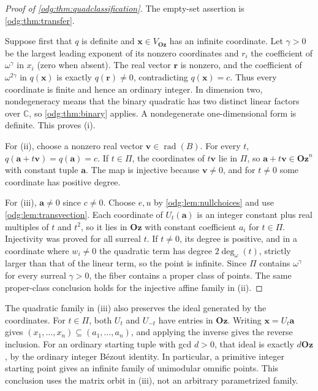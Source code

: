\documentclass[11pt,oneside]{article}
\numberwithin{equation}{section}
\theoremstyle{definition}
\theoremstyle{remark}
\newcommand{\Oz}{\mathbf{Oz}}
\newcommand{\C}{\mathbb C}
\newcommand{\ddeg}{\operatorname{deg}_{\omega}}
\newcommand{\rad}{\operatorname{rad}}
\begin{document}
\begin{proof}[Proof of \cref{odg:thm:quadclassification}]
The empty-set assertion is \cref{odg:thm:transfer}.

Suppose first that $q$ is definite and $\mathbf x\in V_{\Oz}$ has an
infinite coordinate. Let $\gamma>0$ be the largest leading exponent of its
nonzero coordinates and $r_i$ the coefficient of $\omega^\gamma$ in $x_i$
(zero when absent). The real vector $\mathbf r$ is nonzero, and the
coefficient of $\omega^{2\gamma}$ in $q(\mathbf x)$ is exactly
$q(\mathbf r)\ne0$, contradicting $q(\mathbf x)=c$. Thus every coordinate is
finite and hence an ordinary integer. In dimension two, nondegeneracy means
that the binary quadratic has two distinct linear factors over $\C$, so
\cref{odg:thm:binary} applies. A nondegenerate one-dimensional form is
definite. This proves (i).

For (ii), choose a nonzero real vector $\mathbf v\in\rad(B)$. For every $t$,
$q(\mathbf a+t\mathbf v)=q(\mathbf a)=c$. If $t\in\Pi$, the coordinates of
$t\mathbf v$ lie in $\Pi$, so $\mathbf a+t\mathbf v\in\Oz^n$ with constant
tuple $\mathbf a$. The map is injective because $\mathbf v\ne0$, and for
$t\ne0$ some coordinate has positive degree.

For (iii), $\mathbf a\ne0$ since $c\ne0$. Choose $e,u$ by
\cref{odg:lem:nullchoices} and use \cref{odg:lem:transvection}. Each
coordinate of $U_t(\mathbf a)$ is an integer constant plus real multiples of
$t$ and $t^2$, so it lies in $\Oz$ with constant coefficient $a_i$ for
$t\in\Pi$. Injectivity was proved for all surreal $t$. If $t\ne0$, its degree
is positive, and in a coordinate where $w_i\ne0$ the quadratic term has degree
$2\ddeg(t)$, strictly larger than that of the linear term, so the point is
infinite. Since $\Pi$ contains $\omega^\gamma$ for every surreal $\gamma>0$,
the fiber contains a proper class of points. The same proper-class conclusion
holds for the injective affine family in (ii).
\end{proof}

The quadratic family in (iii) also preserves the ideal generated by the
coordinates. For $t\in\Pi$, both $U_t$ and $U_{-t}$ have entries in $\Oz$.
Writing $\mathbf x=U_t\mathbf a$ gives $(x_1,\ldots,x_n)\subseteq
(a_1,\ldots,a_n)$, and applying the inverse gives the reverse inclusion.
For an ordinary starting tuple with gcd $d>0$, that ideal is exactly
$d\Oz$, by the ordinary integer B\'ezout identity. In particular, a primitive
integer starting point gives an infinite family of unimodular omnific
points. This conclusion uses the matrix orbit in (iii), not an arbitrary
parametrized family.
\end{document}
